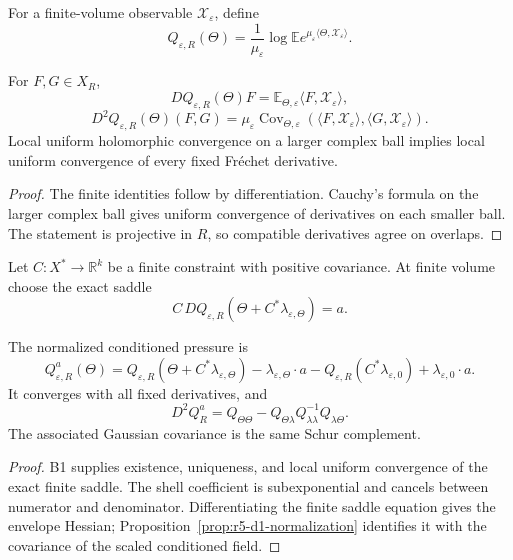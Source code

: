 For a finite-volume observable \({\mathcal X}_\varepsilon\), define
\[
 Q_{\varepsilon,R}(\Theta)
 =\frac1{\mu_\varepsilon}
 \log\mathbb E
 e^{\mu_\varepsilon\langle\Theta,{\mathcal X}_\varepsilon\rangle}.
\]

\begin{proposition}
\label{prop:r5-d1-normalization}
For \(F,G\in X_R\),
\[
 DQ_{\varepsilon,R}(\Theta)F
 =\mathbb E_{\Theta,\varepsilon}\langle F,{\mathcal X}_\varepsilon\rangle,
\]
\[
 D^2Q_{\varepsilon,R}(\Theta)(F,G)
 =\mu_\varepsilon
 \operatorname{Cov}_{\Theta,\varepsilon}
 (\langle F,{\mathcal X}_\varepsilon\rangle,
  \langle G,{\mathcal X}_\varepsilon\rangle).
\]
Local uniform holomorphic convergence on a larger complex ball implies local
uniform convergence of every fixed Fr\'echet derivative.
\end{proposition}

\begin{proof}
The finite identities follow by differentiation.  Cauchy's formula on the
larger complex ball gives uniform convergence of derivatives on each smaller
ball.  The statement is projective in \(R\), so compatible derivatives agree
on overlaps.
\end{proof}

Let \(C:X^*\to\mathbb R^k\) be a finite constraint with positive covariance.
At finite volume choose the exact saddle
\[
 C\,DQ_{\varepsilon,R}(\Theta+C^*\lambda_{\varepsilon,\Theta})=a.
\]

\begin{theorem}
\label{thm:r5-d1-conditioning}
The normalized conditioned pressure is
\[
 Q_{\varepsilon,R}^a(\Theta)
 =
 Q_{\varepsilon,R}(\Theta+C^*\lambda_{\varepsilon,\Theta})
 -\lambda_{\varepsilon,\Theta}\cdot a
 -Q_{\varepsilon,R}(C^*\lambda_{\varepsilon,0})
 +\lambda_{\varepsilon,0}\cdot a.
\]
It converges with all fixed derivatives, and
\[
 D^2Q_R^a
 =
 Q_{\Theta\Theta}
 -Q_{\Theta\lambda}Q_{\lambda\lambda}^{-1}
  Q_{\lambda\Theta}.
\]
The associated Gaussian covariance is the same Schur complement.
\end{theorem}

\begin{proof}
B1 supplies existence, uniqueness, and local uniform convergence of the exact
finite saddle.  The shell coefficient is subexponential and cancels between
numerator and denominator.  Differentiating the finite saddle equation gives
the envelope Hessian; Proposition~\ref{prop:r5-d1-normalization} identifies
it with the covariance of the scaled conditioned field.
\end{proof}

